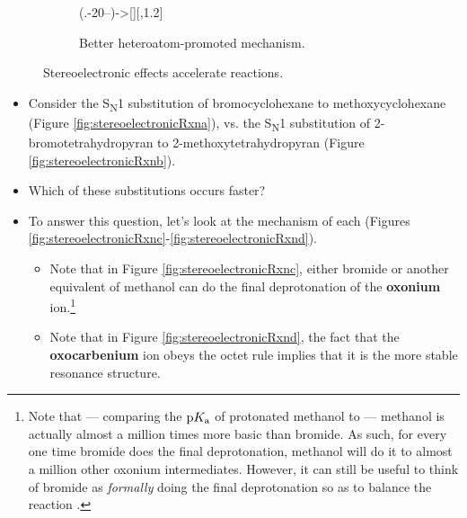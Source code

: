 \documentclass[../notes.tex]{subfiles}
\begin{document}
\begin{itemize}
\begin{figure}[H]
\begin{subfigure}[b]{\linewidth}
                \arrow(.-20--){->[]}[,1.2]
            \schemestop
            \caption{Better heteroatom-promoted mechanism.}
            \label{fig:stereoelectronicRxne}
        \end{subfigure}
        \caption{Stereoelectronic effects accelerate reactions.}
        \label{fig:stereoelectronicRxn}
    \end{figure}
    \begin{itemize}
        \item Consider the S\textsubscript{N}1 substitution of bromocyclohexane to methoxycyclohexane (Figure \ref{fig:stereoelectronicRxna}), vs. the S\textsubscript{N}1 substitution of 2-bromotetrahydropyran to 2-methoxytetrahydropyran (Figure \ref{fig:stereoelectronicRxnb}).
        \item Which of these substitutions occurs faster?
        \item To answer this question, let's look at the mechanism of each (Figures \ref{fig:stereoelectronicRxnc}-\ref{fig:stereoelectronicRxnd}).
        \begin{itemize}
            \item Note that in Figure \ref{fig:stereoelectronicRxnc}, either bromide or another equivalent of methanol can do the final deprotonation of the \textbf{oxonium} ion.\footnote{Note that --- comparing the $\textup{p}K_\textup{a}$ of protonated methanol to  --- methanol is actually almost a million times more basic than bromide. As such, for every one time bromide does the final deprotonation, methanol will do it to almost a million other oxonium intermediates. However, it can still be useful to think of bromide as \emph{formally} doing the final deprotonation so as to balance the reaction .}
            \item Note that in Figure \ref{fig:stereoelectronicRxnd}, the fact that the \textbf{oxocarbenium} ion obeys the octet rule implies that it is the more stable resonance structure.

\end{itemize}
\end{itemize}
\end{itemize}
\end{document}
